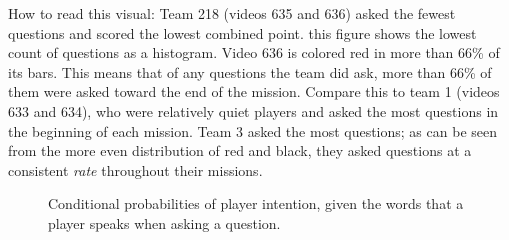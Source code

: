     How to read this visual:
Team 218 (videos 635 and 636) asked the fewest questions and scored the lowest combined point. this figure shows the lowest count of questions as a histogram. Video 636 is colored red in more than 66\% of its bars. This means that of any questions the team did ask, more than 66\% of them were asked toward the end of the mission. Compare this to team 1 (videos 633 and 634), who were relatively quiet players and asked the most questions in the beginning of each mission. Team 3 asked the most questions; as can be seen from the more even distribution of red and black, they asked questions at a consistent \emph{rate} throughout their missions.


\clearpage

\begin{figure}[h!]
    \centering
    \caption{Conditional probabilities of player intention, given the words that a player speaks when asking a question.}
    \end{figure}
    
